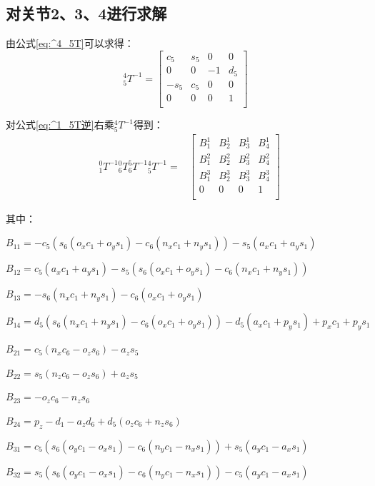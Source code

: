 \documentclass{seuthesis-2022}
\numberwithin{equation}{section}
\begin{document}
  

\subsection{对关节2、3、4进行求解}
由公式\eqref{eq:^4_5T}可以求得：
\begin{equation}
  ^4_5T^{-1} =
  \begin{bmatrix}
    c_5 & s_5 & 0 & 0\\
    0 & 0 & -1 & d_5\\
    -s_5 & c_5 & 0 & 0\\
    0 & 0 & 0 & 1\\
  \end{bmatrix}
\end{equation}

对公式\eqref{eq:^1_5T逆}右乘$^4_5T^{-1}$得到：
\begin{equation}
  \begin{aligned}
    &{^0_1T^{-1}} {^0_6T} {^5_6T^{-1}} {^4_5T^{-1}} =
    &\begin{bmatrix}
      B^1_1 & B^1_2 & B^1_3 & B^1_4\\
      B^2_1 & B^2_2 & B^2_3 & B^2_4\\
      B^3_1 & B^3_2 & B^3_3 & B^3_4\\
      0 & 0 & 0 & 1\\
    \end{bmatrix}
  \end{aligned}
  \label{eq:^1_4T逆}
\end{equation}

其中：

$B_{11} = -c_5\left(s_6(o_xc_1+o_ys_1)-c_6(n_xc_1+n_ys_1)\right) - s_5(a_xc_1+a_ys_1)$

$B_{12} = c_5(a_xc_1+a_ys_1) - s_5\left(s_6(o_xc_1+o_ys_1)-c_6(n_xc_1+n_ys_1)\right)$

$B_{13} = -s_6(n_xc_1+n_ys_1)-c_6(o_xc_1+o_ys_1)$

$B_{14} = d_5\left(s_6(n_xc_1+n_ys_1)-c_6(o_xc_1+o_ys_1)\right) - d_5(a_xc_1+p_ys_1) + p_xc_1 + p_ys_1$

$B_{21} = c_5(n_xc_6-o_zs_6) - a_zs_5$

$B_{22} = s_5(n_zc_6-o_zs_6) + a_zs_5$

$B_{23} = -o_zc_6 - n_zs_6$

$B_{24} = p_z-d_1-a_zd_6 +d_5(o_zc_6+n_zs_6)$

$B_{31} = c_5\left(s_6(o_yc_1-o_xs_1)-c_6(n_yc_1-n_xs_1)\right) + s_5(a_yc_1-a_xs_1)$

$B_{32} = s_5\left(s_6(o_yc_1-o_xs_1)-c_6(n_yc_1-n_xs_1)\right) - c_5(a_yc_1-a_xs_1)$
\end{document}
